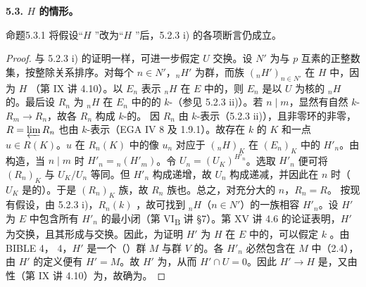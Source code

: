 \textbf{5.3. $H$ 的情形。}
\begin{SGAresult}{命题}{5.3.1}
将假设“$H$ ”改为“$H$ ”后，5.2.3 i) 的各项断言仍成立。
\end{SGAresult}
\begin{proof}
与 5.2.3 i) 的证明一样，可进一步假定 $U$ 交换。设 $N'$ 为与 $p$ 互素的正整数集，按整除关系排序。对每个 $n\in N'$，${}_nH'$ 为群，而族 $({}_nH')_{n\in N'}$ 在 $H$ 中，因为 $H$ （第 IX 讲 4.10）。以 $E_n$ 表示 ${}_nH$ 在 $E$ 中的，则 $E_n$ 是以 $U$ 为核的 ${}_nH$ 的。最后设 $R_n$ 为 ${}_nH$ 在 $E_n$ 中的的 $k$-（参见 5.2.3 ii)）。若 $n\mid m$，显然有自然 $k$- $R_m\to R_n$，故各 $R_n$ 构成 $k$-的。
因 $R_n$ 由 $k$-表示（5.2.3 ii)），且非零环的非零， $R=\varprojlim R_n$ 也由 $k$-表示（EGA IV 8 及 1.9.1）。故存在 $k$ 的 $K$ 和一点 $u\in R(K)$。$u$ 在 $R_n(K)$ 中的像 $u_n$ 对应于 $({}_nH)_K$ 在 $(E_n)_K$ 中的 $H'_n$。由构造，当 $n\mid m$ 时 $H'_n={}_n(H'_m)$。令 $U_n=(U_K)^{H'_n}$。选取 $H'_n$ 便可将 $(R_n)_K$ 与 $U_K/U_n$ 等同。但 $H'_n$ 构成递增，故 $U_n$ 构成递减，并因此在 $n$ 时（$U_K$ 是的）。于是 $(R_n)_K$ 族，故 $R_n$ 族也。总之，对充分大的 $n$，$R_n=R$。
按现有假设，由 5.2.3 i)，$R_n(k)$ ，故可找到 ${}_nH$（$n\in N'$）的一族相容 $H'_n$。设 $H'$ 为 $E$ 中包含所有 $H'_n$ 的最小闭（第 VI\textsubscript{B} 讲 §7）。第 XV 讲 4.6 的论证表明，$H'$ 为交换，且其形成与交换。因此，为证明 $H'$ 为 $H$ 在 $E$ 中的，可以假定 $k$ 。由 BIBLE 4， 4，$H'$ 是一个（）群 $M$ 与群 $V$ 的。各 $H'_n$ 必然包含在 $M$ 中（2.4），由 $H'$ 的定义便有 $H'=M$。故 $H'$ 为，从而 $H'\cap U=0$。因此 $H'\to H$ 是，又由性（第 IX 讲 4.10）为，故确为。

\end{proof}
